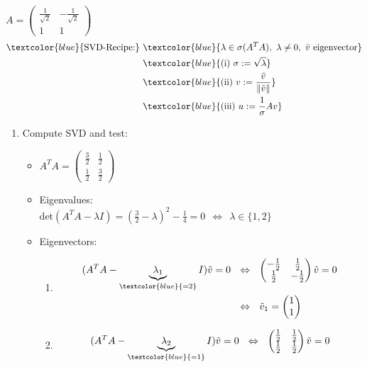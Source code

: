 {\color{solution}
$A=\begin{pmatrix}\frac{1}{\sqrt{2}}&-\frac{1}{\sqrt{2}}\\1&1\end{pmatrix}$
\begin{align*}
\textcolor{blue}{\text{SVD-Recipe:}}~&\textcolor{blue}{\lambda\in\sigma(A^TA),~\lambda\neq 0,~\tilde{v}~\text{eigenvector}}\\&\textcolor{blue}{(\text{i})~\sigma:=\sqrt{\lambda}}\\&\textcolor{blue}{(\text{ii})~v:=\frac{\tilde{v}}{\|\tilde{v}\|}}\\&\textcolor{blue}{(\text{iii})~u:=\frac{1}{\sigma}Av}
\end{align*}
\begin{enumerate}
	\item 
	Compute SVD and test:%
	\begin{itemize}
		\item $A^TA =\begin{pmatrix}\frac{3}{2}&\frac{1}{2}\\\frac{1}{2}&\frac{3}{2}\end{pmatrix}$
		\item Eigenvalues:\\$\text{det}(A^TA-\lambda I) =(\frac{3}{2}-\lambda)^2-\frac{1}{4}=0~~\Leftrightarrow~~\lambda\in\{1,2\}$
		\item Eigenvectors:
		\begin{enumerate}
			\item \begin{align*}(A^TA-\underbrace{\lambda_1}_{\textcolor{blue}{=2}}I)\tilde{v}=0~~&\Leftrightarrow~~\begin{pmatrix}-\frac{1}{2}&\frac{1}{2}\\\frac{1}{2}&-\frac{1}{2}\end{pmatrix}\tilde{v}=0\\
			&\Leftrightarrow~~\tilde{v}_1=\begin{pmatrix}1\\1\end{pmatrix}
			\end{align*}
			\item 
			\begin{align*}
			(A^TA-\underbrace{\lambda_2}_{\textcolor{blue}{=1}}I)\tilde{v}=0~~&\Leftrightarrow~~\begin{pmatrix}\frac{1}{2}&\frac{1}{2}\\\frac{1}{2}&\frac{1}{2}\end{pmatrix}\tilde{v}=0\\

\end{align*}
\end{enumerate}
\end{itemize}
\end{enumerate}}
